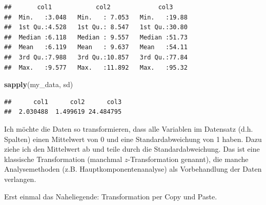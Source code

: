 \documentclass[]{book}
\newenvironment{Shaded}{\begin{snugshade}}{\end{snugshade}}
\newcommand{\DataTypeTok}[1]{\textcolor[rgb]{0.13,0.29,0.53}{#1}}
\newcommand{\KeywordTok}[1]{\textcolor[rgb]{0.13,0.29,0.53}{\textbf{#1}}}
\newcommand{\NormalTok}[1]{#1}
\newcommand{\OperatorTok}[1]{\textcolor[rgb]{0.81,0.36,0.00}{\textbf{#1}}}
\newcommand{\StringTok}[1]{\textcolor[rgb]{0.31,0.60,0.02}{#1}}
\begin{document}
\begin{verbatim}
##       col1            col2             col3      
##  Min.   :3.048   Min.   : 7.053   Min.   :19.88  
##  1st Qu.:4.528   1st Qu.: 8.547   1st Qu.:30.80  
##  Median :6.118   Median : 9.557   Median :51.73  
##  Mean   :6.119   Mean   : 9.637   Mean   :54.11  
##  3rd Qu.:7.988   3rd Qu.:10.857   3rd Qu.:77.84  
##  Max.   :9.577   Max.   :11.892   Max.   :95.32
\end{verbatim}

\begin{Shaded}
\begin{Highlighting}[]
\KeywordTok{sapply}\NormalTok{(my_data, sd)}
\end{Highlighting}
\end{Shaded}

\begin{verbatim}
##      col1      col2      col3 
##  2.030488  1.499619 24.484795
\end{verbatim}

Ich möchte die Daten so transformieren, dass alle Variablen im Datensatz (d.h. Spalten) einen Mittelwert von 0 und eine Standardabweichung von 1 haben. Dazu ziehe ich den Mittelwert ab und teile durch die Standardabweichung. Das ist eine klassische Transformation (manchmal \(z\)-Transformation genannt), die manche Analysemethoden (z.B. Hauptkomponentenanalyse) als Vorbehandlung der Daten verlangen.

Erst einmal das Naheliegende: Transformation per Copy und Paste.

\begin{Shaded}
\end{Shaded}
\end{document}
